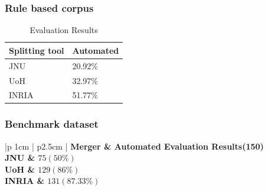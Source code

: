 \documentclass[11pt]{article}
\begin{document}
\subsubsection{Rule based corpus}
\begin{table}[h]
	\begin{center}
		\begin{tabular}{|l|l|}
			\hline \bf Splitting tool & Automated \\ \hline
			JNU&20.92\% \\
			UoH&32.97\% \\
			INRIA&51.77\% \\
			\hline
		\end{tabular}
	\end{center}
	\caption{\label{font-table} Evaluation Results }
\end{table}


\subsubsection{Benchmark dataset}

\begin{table}[h]
	\begin{center}
		\begin{tabular}{|p {1cm}  | p{2.5cm} |}
			\hline \bf  Merger & \bf Automated Evaluation Results(150) \\
			\hline
			JNU &  $75 (50\%)$\\
			UoH &  $129 (86\%)$\\
			INRIA & $131 (87.33\%)$\\
			\hline
		\end{tabular}
	\end{center}
	\caption{\label{font-table} Evaluation Results }
\end{table}
\end{document}
